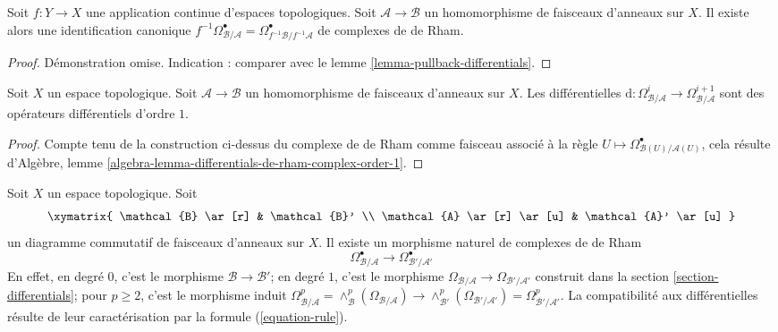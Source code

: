 \begin{lemma}
\label{lemma-pullback-de-rham-complex}
Soit $f : Y \to X$ une application continue d'espaces topologiques. Soit
$\mathcal{A} \to \mathcal{B}$ un homomorphisme de faisceaux d'anneaux sur
$X$. Il existe alors une identification canonique
$f^{-1}\Omega^\bullet_{\mathcal{B}/\mathcal{A}} =
\Omega^\bullet_{f^{-1}\mathcal{B}/f^{-1}\mathcal{A}}$
de complexes de de Rham.
\end{lemma}

\begin{proof}
Démonstration omise. Indication : comparer avec le lemme
\ref{lemma-pullback-differentials}.
\end{proof}

\begin{lemma}
\label{lemma-differentials-de-rham-complex-order-1}
Soit $X$ un espace topologique. Soit $\mathcal{A} \to \mathcal{B}$ un
homomorphisme de faisceaux d'anneaux sur $X$. Les différentielles
$\text{d} : \Omega^i_{\mathcal{B}/\mathcal{A}}  \to
\Omega^{i + 1}_{\mathcal{B}/\mathcal{A}}$
sont des opérateurs différentiels d'ordre $1$.
\end{lemma}

\begin{proof}
Compte tenu de la construction ci-dessus du complexe de de Rham comme
faisceau associé à la règle
$U \mapsto \Omega^\bullet_{\mathcal{B}(U)/\mathcal{A}(U)}$, cela résulte
d'Algèbre, lemme
\ref{algebra-lemma-differentials-de-rham-complex-order-1}.
\end{proof}

\noindent
Soit $X$ un espace topologique. Soit
$$
\xymatrix{
\mathcal{B} \ar[r] & \mathcal{B}' \\
\mathcal{A} \ar[r] \ar[u] & \mathcal{A}' \ar[u]
}
$$
un diagramme commutatif de faisceaux d'anneaux sur $X$. Il existe un
morphisme naturel de complexes de de Rham
$$
\Omega^\bullet_{\mathcal{B}/\mathcal{A}} \longrightarrow
\Omega^\bullet_{\mathcal{B}'/\mathcal{A}'}
$$
En effet, en degré $0$, c'est le morphisme
$\mathcal{B} \to \mathcal{B}'$; en degré $1$, c'est le morphisme
$\Omega_{\mathcal{B}/\mathcal{A}} \to \Omega_{\mathcal{B}'/\mathcal{A}'}$
construit dans la section \ref{section-differentials}; pour $p \geq 2$, c'est
le morphisme induit
$\Omega^p_{\mathcal{B}/\mathcal{A}} =
\wedge^p_\mathcal{B}(\Omega_{\mathcal{B}/\mathcal{A}}) \to
\wedge^p_{\mathcal{B}'}(\Omega_{\mathcal{B}'/\mathcal{A}'}) =
\Omega^p_{\mathcal{B}'/\mathcal{A}'}$.
La compatibilité aux différentielles résulte de leur caractérisation par la
formule (\ref{equation-rule}).

